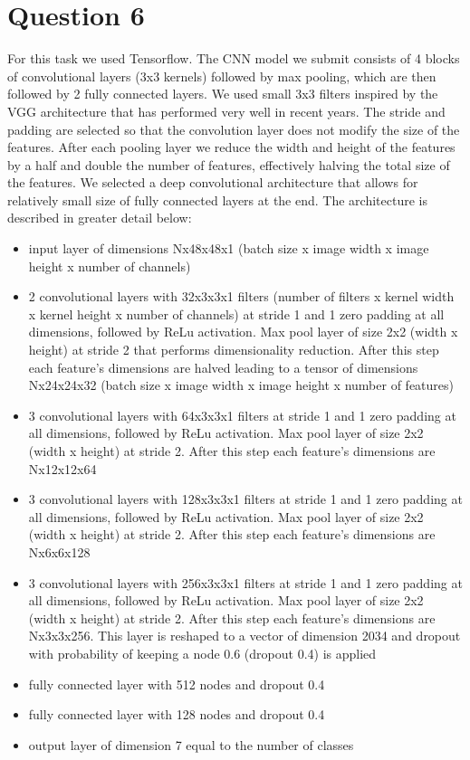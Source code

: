 \documentclass[12pt,twoside]{article}
\begin{document}
\section{Question 6}
For this task we used Tensorflow. The CNN model we submit consists of 4 blocks of convolutional layers (3x3 kernels) followed by max pooling, which are then followed by 2 fully connected layers. We used small 3x3 filters inspired by the VGG architecture that has performed very well in recent years. The stride and padding are selected so that the convolution layer does not modify the size of the features. After each pooling layer we reduce the width and height of the features by a half and double the number of features, effectively halving the total size of the features. We selected a deep convolutional architecture that allows for relatively small size of fully connected layers at the end. The architecture is described in greater detail below:  

\begin{itemize}
\item input layer of dimensions Nx48x48x1 (batch size x image width x image height x number of channels)
\item 2 convolutional layers with 32x3x3x1 filters (number of filters x kernel width x kernel height x number of channels) at stride 1 and 1 zero padding at all dimensions, followed by ReLu activation.  Max pool layer of size 2x2 (width x height) at stride 2 that performs dimensionality reduction. After this step each feature's dimensions are halved leading to a tensor of dimensions Nx24x24x32 (batch size x image width x image height x number of features)
\item 3 convolutional layers with 64x3x3x1 filters at stride 1 and 1 zero padding at all dimensions, followed by ReLu activation. Max pool layer of size 2x2 (width x height) at stride 2. After this step each feature's dimensions are Nx12x12x64 
\item 3 convolutional layers with 128x3x3x1 filters at stride 1 and 1 zero padding at all dimensions, followed by ReLu activation. Max pool layer of size 2x2 (width x height) at stride 2. After this step each feature's dimensions are Nx6x6x128 
\item 3 convolutional layers with 256x3x3x1 filters at stride 1 and 1 zero padding at all dimensions, followed by ReLu activation. Max pool layer of size 2x2 (width x height) at stride 2. After this step each feature's dimensions are Nx3x3x256. This  layer is reshaped to a vector of dimension 2034 and dropout with probability of keeping a node 0.6 (dropout 0.4) is applied
\item fully connected layer with 512 nodes and dropout 0.4
\item fully connected layer with 128 nodes and dropout 0.4
\item output layer of dimension 7 equal to the number of classes
\end{itemize}
\end{document}
